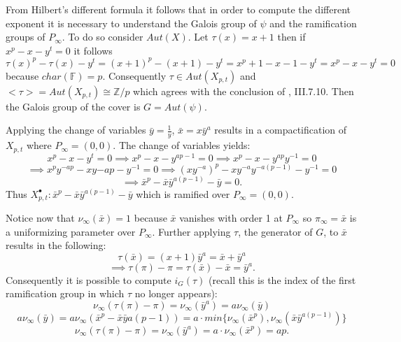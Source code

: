 \documentclass[paper=a4, fontsize=11pt]{scrartcl} %
\numberwithin{equation}{section} %
\numberwithin{figure}{section} %
\numberwithin{table}{section} %
\theoremstyle{break}
\begin{document}
From Hilbert's different formula it follows that in order to compute the different exponent it is necessary to understand the Galois group of $\psi$ and the ramification groups of $P_\infty$. To do so consider $Aut(X)$. Let $\tau(x)=x+1$ then if $x^p - x - y^t = 0$ it follows
$$
\tau(x)^p - \tau(x) - y^t = (x+1)^p - (x+1) - y^t = x^p + 1 - x - 1 - y^t = x^p-x-y^t = 0
$$
because $char(\mathbb{F})=p$. Consequently $\tau\in Aut(X_{p,t})$  and $<\tau>= Aut(X_{p,t}) \cong \mathbb{Z}/p$ which agrees with the conclusion of \cite{stitchenoth}, III.7.10. Then the Galois group of the cover is $G=Aut(\psi)$.

Applying the change of variables $\bar{y}=\frac{1}{y}$, $\bar{x}=x\bar{y}^a$ results in a compactification of $X_{p,t}$ where $P_\infty = (0,0)$. The change of variables yields:
$$x^p-x-y^t = 0 \implies x^p-x-y^{ap-1}=0 \implies x^p-x-y^{ap}y^{-1}=0 $$
$$\implies x^p y^{-ap} -xy{-ap}-y^{-1}=0 \implies (xy^{-a})^p - xy^{-a}y^{-a(p-1)}-y^{-1}=0 $$
$$\implies \bar{x}^p-\bar{x}\bar{y}^{a(p-1)}-\bar{y} = 0.$$
Thus $X^{\bullet}_{p,t}: \bar{x}^p-\bar{x}\bar{y}^{a(p-1)}-\bar{y}$ which is ramified over $P_\infty = (0,0)$.

Notice now that $\nu_\infty(\bar{x}) = 1$ because $\bar{x}$ vanishes with order 1 at $P_\infty$ so $\pi_\infty = \bar{x}$ is a uniformizing parameter over $P_\infty$. Further applying $\tau$, the generator of $G$, to $\bar{x}$ results in the following:
$$\tau(\bar{x}) = (x+1)\bar{y}^a = \bar{x} + \bar{y}^a$$
$$\implies \tau(\pi)-\pi =  \tau(\bar{x}) - \bar{x} = \bar{y}^a.$$
Consequently it is possible to compute $i_G(\tau)$ (recall this is the index of the first ramification group in which $\tau$ no longer appears):
$$\nu_\infty(\tau(\pi)-\pi) = \nu_\infty(\bar{y}^a)=a\nu_\infty(\bar{y})$$
$$a\nu_\infty(\bar{y})=a\nu_\infty(\bar{x}^p - \bar{x}\bar{y}{a(p-1)})=a\cdot min\{\nu_\infty(\bar{x}^p),\nu_\infty(\bar{x}\bar{y}^{a(p-1)})\}$$
$$\nu_\infty(\tau(\pi)-\pi) = \nu_\infty(\bar{y}^a) = a\cdot\nu_\infty(\bar{x}^p)=ap.$$
\end{document}
